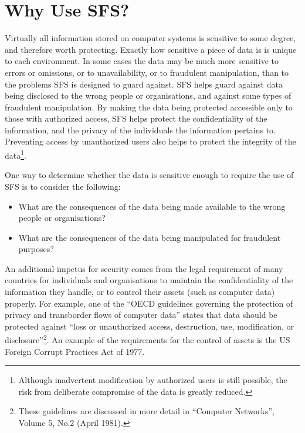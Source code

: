\section{Why Use SFS?}
Virtually all information stored on computer systems is sensitive to some
degree, and therefore worth protecting.  Exactly how sensitive a piece of data
is is unique to each environment.  In some cases the data may be much more
sensitive to errors or omissions, or to unavailability, or to fraudulent
manipulation, than to the problems SFS is designed to guard against.  SFS helps
guard against data being disclosed to the wrong people or organisations, and
against some types of fraudulent manipulation.  By making the data being
protected accessible only to those with authorized access, SFS helps protect
the confidentiality of the information, and the privacy of the individuals the
information pertains to.  Preventing access by unauthorized users also helps to
protect the integrity of the data\footnote{
		Although inadvertent modification by authorized users is still
              	possible, the risk from deliberate compromise of the data is
              	greatly reduced.
}.

One way to determine whether the data is sensitive enough to require the use of
SFS is to consider the following:

\begin{itemize}
\item  What are the consequences of the data being made available to the wrong
  people or organisations?

\item  What are the consequences of the data being manipulated for fraudulent
  purposes?
\end{itemize}

An additional impetus for security comes from the legal requirement of many
countries for individuals and organisations to maintain the confidentiality of
the information they handle, or to control their assets (such as computer data)
properly.  For example, one of the ``OECD guidelines governing the protection of
privacy and transborder flows of computer data'' states that data should be
protected against ``loss or unauthorized access, destruction, use, modification,
or disclosure''\footnote{
		These guidelines are discussed in more detail in ``Computer
              	Networks'', Volume 5, No.2 (April 1981).               
}.  An example of the requirements for the control of assets is
the US Foreign Corrupt Practices Act of 1977.

